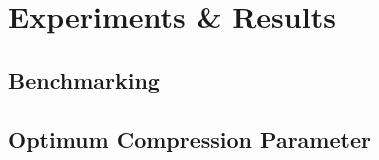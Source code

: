\chapter{Experiments \& Results}\label{chpt:3}
\section{Benchmarking}\label{sec:3_1_benchmarking}

\section{Optimum Compression Parameter}
